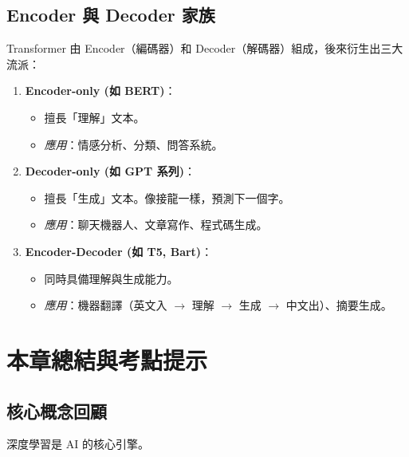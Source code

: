 \documentclass[
  letterpaper,
  DIV=11,
  numbers=noendperiod]{scrreprt}
\providecommand{\tightlist}{%
  \setlength{\itemsep}{0pt}\setlength{\parskip}{0pt}}
\begin{document}
\section{Encoder 與 Decoder
家族}\label{encoder-ux8207-decoder-ux5bb6ux65cf}

Transformer 由 Encoder（編碼器）和
Decoder（解碼器）組成，後來衍生出三大流派：

\begin{enumerate}
\def\labelenumi{\arabic{enumi}.}
\tightlist
\item
  \textbf{Encoder-only (如 BERT)}：

  \begin{itemize}
  \tightlist
  \item
    擅長「理解」文本。
  \item
    \emph{應用}：情感分析、分類、問答系統。
  \end{itemize}
\item
  \textbf{Decoder-only (如 GPT 系列)}：

  \begin{itemize}
  \tightlist
  \item
    擅長「生成」文本。像接龍一樣，預測下一個字。
  \item
    \emph{應用}：聊天機器人、文章寫作、程式碼生成。
  \end{itemize}
\item
  \textbf{Encoder-Decoder (如 T5, Bart)}：

  \begin{itemize}
  \tightlist
  \item
    同時具備理解與生成能力。
  \item
    \emph{應用}：機器翻譯（英文入 \(\to\) 理解 \(\to\) 生成 \(\to\)
    中文出）、摘要生成。
  \end{itemize}
\end{enumerate}

\chapter{本章總結與考點提示}\label{sec-chapter7-summary}

\section{核心概念回顧}\label{ux6838ux5fc3ux6982ux5ff5ux56deux9867-6}

深度學習是 AI 的核心引擎。
\end{document}
